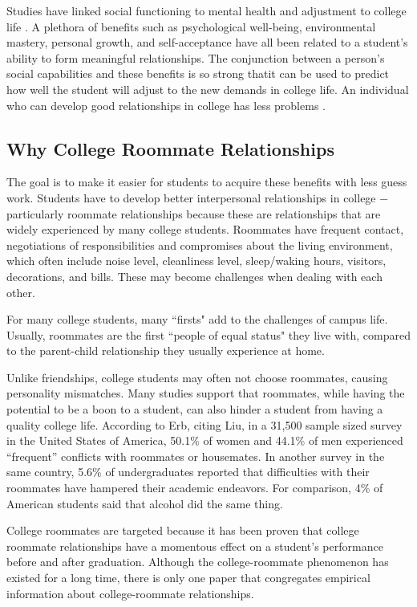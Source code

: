 \documentclass[journal]{IEEEtran}
\begin{document}
    Studies have linked social functioning to mental health and adjustment to college life \cite{erb}. A plethora of
    benefits such as psychological well-being, environmental mastery, personal growth, and self-acceptance have all been
    related to a student's ability to form meaningful relationships\cite{erb}. The conjunction between a person{'}s
    social capabilities and these benefits is so strong thatit can be used to predict how well the student will adjust
    to the new demands in college life. An individual who can develop good relationships in college has less problems
    \cite{erb}. 

    \subsection{Why College Roommate Relationships}
    The goal is to make it easier for students to acquire these benefits with less guess work. Students have to develop
    better interpersonal relationships in college $-$ particularly roommate relationships because these are
    relationships that are widely experienced by many college students\cite{erb}. Roommates have frequent contact,
    negotiations of responsibilities and compromises about the living environment, which often include noise level,
    cleanliness level, sleep/waking hours, visitors, decorations, and bills\cite{erb}. These may become challenges when
    dealing with each other. 

    For many college students, many {``firsts"} add to the challenges of campus life. Usually, roommates are the first
    {``people of equal status"} they live with, compared to the parent-child relationship they usually experience at
    home\cite{erb}.

    Unlike friendships, college students may often not choose roommates, causing personality mismatches. Many studies
    support that roommates, while having the potential to be a boon to a student, can also hinder a student from having
    a quality college life. According to Erb\cite{erb}, citing Liu\cite{liu}, in a 31,500 sample sized survey in the
    United States of America, 50.1\% of women and 44.1\% of men experienced “frequent” conflicts with roommates or
    housemates. In another survey in the same country, 5.6\% of undergraduates reported that difficulties with their
    roommates have hampered their academic endeavors\cite{erb}. For comparison, 4\% of American students said that
    alcohol did the same thing\cite{erb}.

    College roommates are targeted because it has been proven that college roommate relationships have a momentous
    effect on a student's performance before and after graduation. Although the college-roommate phenomenon has existed
    for a long time, there is only one paper that congregates empirical information about college-roommate
    relationships\cite{erb}. 
\end{document}
